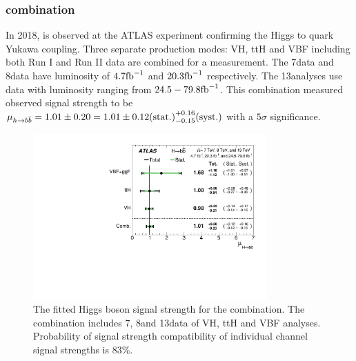 
\subsubsection{\Hbb combination}
\label{sec:vbf-hbbcomb}

In 2018, \Hbb is observed at the ATLAS experiment \cite{VHPaper} confirming the Higgs to quark Yukawa coupling. Three separate \Hbb production modes: VH, ttH and VBF including both Run I and Run II data are combined for a measurement. The 7\TeV data and 8\TeV data have luminosity of $4.7\rm{fb}^{-1}$ and $20.3\rm{fb}^{-1}$ respectively. The 13\TeV analyses use data with luminosity ranging from $24.5-79.8\rm{fb}^{-1}$. This combination measured observed signal strength to be $\mu_{h \rightarrow b\bar{b}}= 1.01 \pm 0.20 = 1.01 \pm 0.12\text{(stat.)}^{+0.16}_{-0.15}\text{(syst.)}$ with a $5\sigma$ significance.


\begin{figure}[htbp]
  \centering
 \includegraphics[width=0.8\textwidth]{figures/VBF/HbbComb.pdf}
 \caption{The fitted Higgs boson signal strength for the \Hbb combination. The combination includes 7\TeV, 8\TeV and 13\TeV data of VH, ttH and VBF analyses. Probability of signal strength compatibility of individual channel signal strengths is 83\%.}
  \label{fig:vbf-combination-hbb}
\end{figure}



